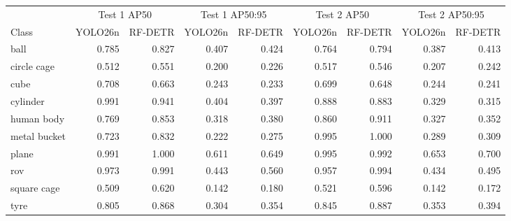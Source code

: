 \begin{tabular}{lrrrrrrrr}
\toprule
 & \multicolumn{2}{c}{Test 1 AP50} & \multicolumn{2}{c}{Test 1 AP50:95} & \multicolumn{2}{c}{Test 2 AP50} & \multicolumn{2}{c}{Test 2 AP50:95} \\
\cmidrule(lr){2-3}\cmidrule(lr){4-5}\cmidrule(lr){6-7}\cmidrule(lr){8-9}
Class & YOLO26n & RF-DETR & YOLO26n & RF-DETR & YOLO26n & RF-DETR & YOLO26n & RF-DETR \\
\midrule
ball & 0.785 & 0.827 & 0.407 & 0.424 & 0.764 & 0.794 & 0.387 & 0.413 \\
circle cage & 0.512 & 0.551 & 0.200 & 0.226 & 0.517 & 0.546 & 0.207 & 0.242 \\
cube & 0.708 & 0.663 & 0.243 & 0.233 & 0.699 & 0.648 & 0.244 & 0.241 \\
cylinder & 0.991 & 0.941 & 0.404 & 0.397 & 0.888 & 0.883 & 0.329 & 0.315 \\
human body & 0.769 & 0.853 & 0.318 & 0.380 & 0.860 & 0.911 & 0.327 & 0.352 \\
metal bucket & 0.723 & 0.832 & 0.222 & 0.275 & 0.995 & 1.000 & 0.289 & 0.309 \\
plane & 0.991 & 1.000 & 0.611 & 0.649 & 0.995 & 0.992 & 0.653 & 0.700 \\
rov & 0.973 & 0.991 & 0.443 & 0.560 & 0.957 & 0.994 & 0.434 & 0.495 \\
square cage & 0.509 & 0.620 & 0.142 & 0.180 & 0.521 & 0.596 & 0.142 & 0.172 \\
tyre & 0.805 & 0.868 & 0.304 & 0.354 & 0.845 & 0.887 & 0.353 & 0.394 \\
\bottomrule
\end{tabular}
